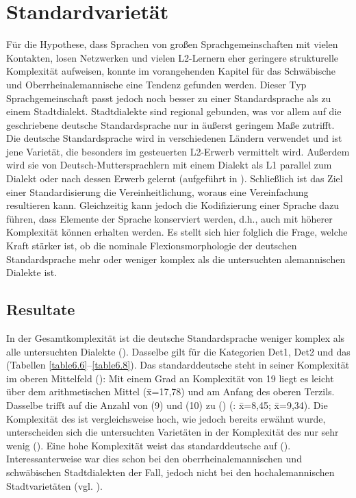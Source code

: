 \section{Standardvarietät}\label{6.4}

Für die Hypothese, dass Sprachen von großen Sprachgemeinschaften mit vielen Kontakten, losen Netzwerken und vielen L2-Ler\-nern eher geringere strukturelle Komplexität aufweisen, konnte im vorangehenden Kapitel für das Schwäbische und Oberrheinalemannische eine Tendenz gefunden werden. Dieser Typ Sprachgemeinschaft passt jedoch noch besser zu einer Standardsprache als zu einem Stadtdialekt. Stadtdialekte sind regional gebunden, was vor allem auf die geschriebene deutsche Standardsprache nur in äußerst geringem Maße zutrifft. Die deutsche Standardsprache wird in verschiedenen Ländern verwendet und ist jene Varietät, die besonders im gesteuerten L2-Er\-werb vermittelt wird. Außerdem wird sie von Deutsch-Muttersprachlern mit einem Dialekt als L1 parallel zum Dialekt oder nach dessen Erwerb gelernt (aufgeführt in ). Schließlich ist das Ziel einer Standardisierung die Vereinheitlichung, woraus eine Vereinfachung resultieren kann. Gleichzeitig kann jedoch die Kodifizierung einer Sprache dazu führen, dass Elemente der Sprache konserviert werden, d.h., auch  mit höherer Komplexität können erhalten werden. Es stellt sich hier folglich die Frage, welche Kraft stärker ist, ob die nominale Flexionsmorphologie der deutschen Standardsprache mehr oder weniger komplex als die untersuchten alemannischen Dialekte ist.

\subsection{Resultate}\label{6.4.1}

In der Gesamtkomplexität ist die deutsche Standardsprache weniger komplex als alle untersuchten Dialekte (). Dasselbe gilt für die Kategorien Det1, Det2 und das  (Tabellen \ref{table6.6}–\ref{table6.8}). Das standarddeutsche  steht in seiner Komplexität im oberen Mittelfeld (): Mit einem Grad an Komplexität von 19 liegt es leicht über dem arithmetischen Mittel (\={x}=17,78) und am Anfang des oberen Terzils. Dasselbe trifft auf die Anzahl von  (9) und  (10) zu () (: \={x}=8,45;  \={x}=9,34). Die Komplexität des  ist vergleichsweise hoch, wie jedoch bereits erwähnt wurde, unterscheiden sich die untersuchten Varietäten in der Komplexität des  nur sehr wenig (). Eine hohe Komplexität weist das  standarddeutsche  auf (). Interessanterweise war dies schon bei den oberrheinalemannischen und schwäbischen Stadtdialekten der Fall, jedoch nicht bei den hochalemannischen Stadtvarietäten (vgl. ).

